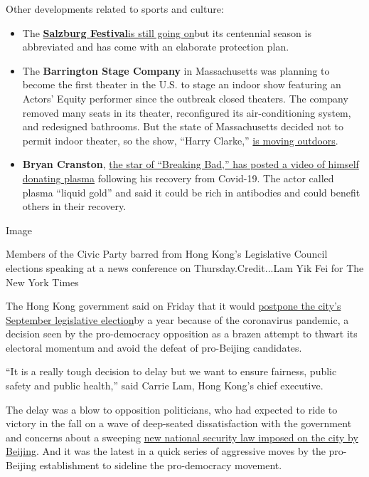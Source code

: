 Other developments related to sports and culture:

\begin{itemize}
\item
  The
  \textbf{\href{https://www.nytimes.com/2020/07/31/arts/music/salzburg-festival-coronavirus-cosi.html}{Salzburg
  Festival}}\href{https://www.nytimes.com/2020/07/31/arts/music/salzburg-festival-coronavirus-cosi.html}{is
  still going on}but its centennial season is abbreviated and has come
  with an elaborate protection plan.
\item
  The \textbf{Barrington Stage Company} in Massachusetts was planning to
  become the first theater in the U.S. to stage an indoor show featuring
  an Actors' Equity performer since the outbreak closed theaters. The
  company removed many seats in its theater, reconfigured its
  air-conditioning system, and redesigned bathrooms. But the state of
  Massachusetts decided not to permit indoor theater, so the show,
  ``Harry Clarke,''
  \href{https://www.nytimes.com/2020/07/30/theater/the-first-equity-authorized-indoor-theater-is-moving-outdoors.html}{is
  moving outdoors}.
\item
  \textbf{Bryan Cranston},
  \href{https://www.nytimes.com/2020/07/31/arts/television/bryan-cranston-coronavirus-plasma.html}{the
  star of ``Breaking Bad,'' has posted a video of himself donating
  plasma} following his recovery from Covid-19. The actor called plasma
  ``liquid gold'' and said it could be rich in antibodies and could
  benefit others in their recovery.
\end{itemize}

Image

Members of the Civic Party barred from Hong Kong's Legislative Council
elections speaking at a news conference on Thursday.Credit...Lam Yik Fei
for The New York Times

The Hong Kong government said on Friday that it would
\href{https://www.nytimes.com/2020/07/31/world/asia/hong-kong-election-delayed.html}{postpone
the city's September legislative election}by a year because of the
coronavirus pandemic, a decision seen by the pro-democracy opposition as
a brazen attempt to thwart its electoral momentum and avoid the defeat
of pro-Beijing candidates.

``It is a really tough decision to delay but we want to ensure fairness,
public safety and public health,'' said Carrie Lam, Hong Kong's chief
executive.

The delay was a blow to opposition politicians, who had expected to ride
to victory in the fall on a wave of deep-seated dissatisfaction with the
government and concerns about a sweeping
\href{https://www.nytimes.com/2020/07/05/world/asia/hong-kong-security-law.html}{new
national security law imposed on the city by Beijing}. And it was the
latest in a quick series of aggressive moves by the pro-Beijing
establishment to sideline the pro-democracy movement.

